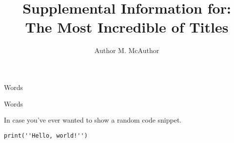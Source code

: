 \documentclass[12pt]{article}
\begin{document}
\title{\Large \bf{Supplemental Information for: \\
\large The Most Incredible of Titles}\vspace{-0.2cm}}
\author{Author M. McAuthor\vspace{-0.4cm}}
\date{\vspace{-0.5cm}}
\maketitle

Words



Words



In case you've ever wanted to show a random code snippet.

\begin{lstlisting}[style=P1]
print(''Hello, world!'')
\end{lstlisting}
\end{document}
